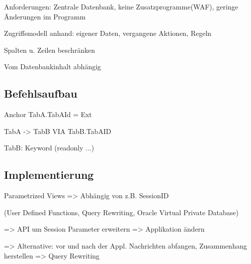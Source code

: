 Anforderungen: Zentrale Datenbank, keine Zusatzprogramme(WAF), geringe Änderungen im Programm

Zugriffsmodell anhand: eigener Daten, vergangene Aktionen, Regeln

Spalten u. Zeilen beschränken

Vom Datenbankinhalt abhängig



\subsection*{Befehlsaufbau}
Anchor TabA.TabAId = Ext

TabA -> TabB VIA TabB.TabAID 

TabB: Keyword (readonly ...)


\subsection*{Implementierung}

Parametrized Views => Abhängig von z.B. SessionID

(User Defined Functions, Query Rewriting, Oracle Virtual Private Database)

=> API um Session Parameter erweitern => Applikation ändern

=> Alternative: vor und nach der Appl. Nachrichten abfangen, Zusammenhang herstellen => Query Rewriting
